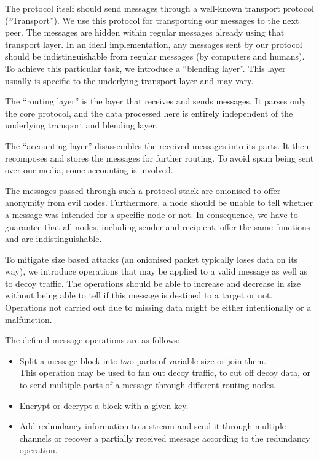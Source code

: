 The protocol itself should send messages through a well-known transport protocol (``Transport''). We use this protocol for transporting our messages to the next peer. The messages are hidden within regular messages already using that transport layer. In an ideal implementation, any messages sent by our protocol should be indistinguishable from regular messages (by computers and humans). To achieve this particular task, we introduce a ``blending layer''. This layer usually is specific to the underlying transport layer and may vary.

The ``routing layer'' is the layer that receives and sends messages. It parses only the core protocol, and the data processed here is entirely independent of the underlying transport and blending layer.

The ``accounting layer'' disassembles the received messages into its parts. It then recomposes and stores the messages for further routing. To avoid spam being sent over our media, some accounting is involved. 

The messages passed through such a protocol stack are onionised to offer anonymity from evil nodes. Furthermore, a node should be unable to tell whether a message was intended for a specific node or not. In consequence, we have to guarantee that all nodes, including sender and recipient, offer the same functions and are indistinguishable.

To mitigate size based attacks (an onionised packet typically loses data on its way), we introduce operations that may be applied to a valid message as well as to decoy traffic. The operations should be able to increase and decrease in size without being able to tell if this message is destined to a target or not. Operations not carried out due to missing data might be either intentionally or a malfunction.

The defined message operations are as follows:
\begin{itemize}
	\item Split a message block into two parts of variable size or join them.\\
	This operation may be used to fan out decoy traffic, to cut off decoy data, or to send multiple parts of a message through different routing nodes.
	\item Encrypt or decrypt a block with a given key.      
	\item Add redundancy information to a stream and send it through multiple channels or recover a partially received message according to the redundancy operation.
\end{itemize}

